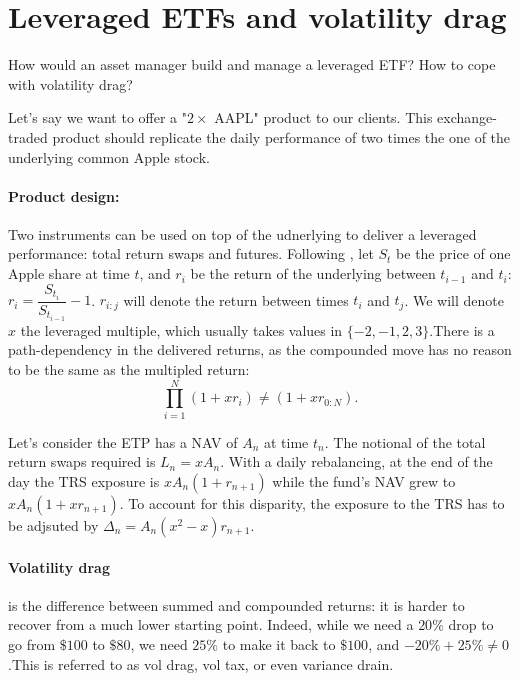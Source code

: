 \section{Leveraged ETFs and volatility drag}

\begin{tcolorbox}[width=\linewidth, sharp corners=all, colback=white!95!black]
How would an asset manager build and manage a leveraged ETF? How to cope with volatility drag?
\end{tcolorbox}

Let's say we want to offer a "$2\times$ AAPL" product to our clients. This exchange-traded product should replicate the daily performance of two times the one of the underlying common Apple stock.

\paragraph*{Product design:} Two instruments can be used on top of the udnerlying to deliver a leveraged performance: total return swaps and futures. Following \cite{cheng2009dynamics}, let $S_t$ be the price of one Apple share at time $t$, and $r_i$ be the return of the underlying between $t_{i-1}$ and $t_i$: $r_i = \dfrac{S_{t_{i}}}{S_{t_{i-1}}} - 1$. $r_{i\colon j}$ will denote the return between times $t_i$ and $t_j$. We will denote $x$ the leveraged multiple, which usually takes values in $\{-2, -1, 2, 3\}$.\newline There is a path-dependency in the delivered returns, as the compounded move has no reason to be the same as the multipled return: \[\prod_{i=1}^N (1+xr_i) \neq (1+xr_{0\colon N}).\]

Let's consider the ETP has a NAV of $A_n$ at time $t_n$. The notional of the total return swaps required is $L_n = x A_n$. With a daily rebalancing, at the end of the day the TRS exposure is $x A_n (1+r_{n+1})$ while the fund's NAV grew to $x A_n (1+xr_{n+1})$. To account for this disparity, the exposure to the TRS has to be adjsuted by $\Delta_n = A_n (x^2-x) r_{n+1}$.

\paragraph*{Volatility drag} is the difference between summed and compounded returns: it is harder to recover from a much lower starting point. Indeed, while we need a $20\%$ drop to go from $\$100$ to $\$80$, we need $25\%$ to make it back to $\$100$, and $-20\%+25\% \neq 0$.\newline This is referred to as vol drag, vol tax, or even variance drain.
